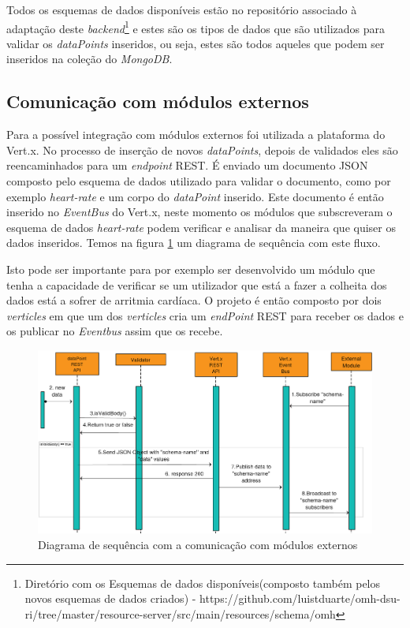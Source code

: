 Todos os esquemas de dados disponíveis estão no repositório associado à adaptação deste \textit{backend}\footnote{ Diretório com os Esquemas de dados disponíveis(composto também pelos novos esquemas de dados criados) - https://github.com/luistduarte/omh-dsu-ri/tree/master/resource-server/src/main/resources/schema/omh} e estes são os tipos de dados que são utilizados para validar os  \textit{dataPoints} inseridos, ou seja, estes são todos aqueles que podem ser inseridos na coleção do  \textit{MongoDB}.

\subsection{Comunicação com módulos externos}
Para a possível integração com módulos externos foi utilizada a plataforma do Vert.x. No processo de inserção de novos \textit{dataPoints}, depois de validados eles são reencaminhados para um \textit{endpoint} \gls{REST}. É enviado um documento \gls{JSON} composto pelo esquema de dados utilizado para validar o documento, como por exemplo \textit{heart-rate} e um corpo do \textit{dataPoint} inserido. Este documento é então inserido no \textit{EventBus} do Vert.x, neste momento os módulos que subscreveram o esquema de dados \textit{heart-rate} podem verificar e analisar da maneira que quiser os dados inseridos. Temos na figura \ref{f:toExtSeqDiagram} um diagrama de sequência com este fluxo. \par
Isto pode ser importante para por exemplo ser desenvolvido um módulo que tenha a capacidade de verificar se um utilizador que está a fazer a colheita dos dados está a sofrer de arritmia cardíaca.
O projeto é então composto por dois \textit{verticles} em que um dos \textit{verticles} cria um \textit{endPoint} \gls{REST} para receber os dados e os publicar no \textit{Eventbus} assim que os recebe.

\begin{figure}[H]
  \centering
  \includegraphics[width=1\textwidth]{imgs/toExtSeqDiagram.png}
  \caption[Diagrama de sequência com a comunicação com módulos externos]{Diagrama de sequência com a comunicação com módulos externos}
  
  \label{f:toExtSeqDiagram}
\end{figure}

